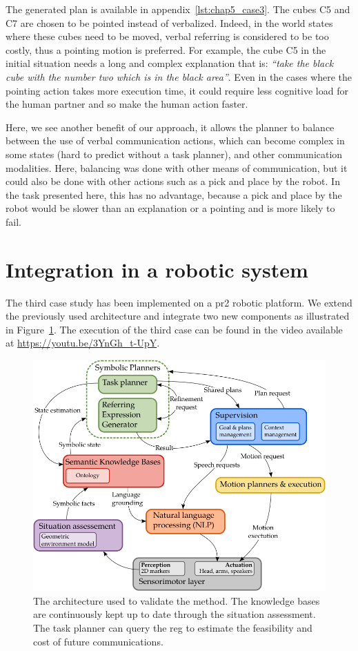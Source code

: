 The generated plan is available in appendix~\ref{lst:chap5_case3}. The cubes C5 and C7 are chosen to be pointed instead of verbalized. Indeed, in the world states where these cubes need to be moved, verbal referring is considered to be too costly, thus a pointing motion is preferred. For example, the cube C5 in the initial situation needs a long and complex explanation that is: \textit{``take the black cube with the number two which is in the black area''}. Even in the cases where the pointing action takes more execution time, it could require less cognitive load for the human partner and so make the human action faster.

Here, we see another benefit of our approach, it allows the planner to balance between the use of verbal communication actions, which can become complex in some states (hard to predict without a task planner), and other communication modalities. Here, balancing was done with other means of communication, but it could also be done with other actions such as a pick and place by the robot. In the task presented here, this has no advantage, because a pick and place by the robot would be slower than an explanation or a pointing and is more likely to fail.

\section{Integration in a robotic system}

The third case study has been implemented on a pr2 robotic platform. We extend the previously used architecture and integrate two new components as illustrated in Figure~\ref{fig:chap5_archi}. The execution of the third case can be found in the video available at \url{https://youtu.be/3YnGh_t-UpY}.

\begin{figure}[!ht]
\centering
\includegraphics[scale=0.6]{figures/chapter5/architecture.png}
\caption{\label{fig:chap5_archi} The architecture used to validate the method. The knowledge bases are continuously kept up to date through the situation assessment. The task planner can query the \acrshort{reg} to estimate the feasibility and cost of future communications. }
\end{figure}

